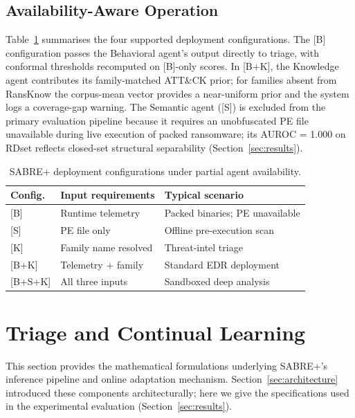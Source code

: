 \documentclass[journal]{IEEEtran}
\begin{document}
\subsection{Availability-Aware Operation}
\label{subsec:availability}

Table~\ref{tab:deployment_configs} summarises the four supported deployment configurations.
The {[}B{]} configuration passes the Behavioral agent's output directly to triage, with
conformal thresholds recomputed on {[}B{]}-only scores.
In {[}B{+}K{]}, the Knowledge agent contributes its family-matched ATT\&CK prior; for
families absent from RansKnow the corpus-mean vector provides a near-uniform prior and
the system logs a coverage-gap warning.
The Semantic agent ({[}S{]}) is excluded from the primary evaluation pipeline because it
requires an unobfuscated PE file unavailable during live execution of packed ransomware;
its AUROC = 1.000 on RDset reflects closed-set structural separability
(Section~\ref{sec:results}).

\begin{table}[t]
\centering
\caption{SABRE+ deployment configurations under partial agent availability.}
\label{tab:deployment_configs}
\setlength{\tabcolsep}{3pt}
\begin{tabular}{lp{2.1cm}p{2.3cm}}
\toprule
\textbf{Config.} & \textbf{Input requirements} & \textbf{Typical scenario} \\
\midrule
{[}B{]}       & Runtime telemetry    & Packed binaries; PE unavailable \\
{[}S{]}       & PE file only         & Offline pre-execution scan \\
{[}K{]}       & Family name resolved & Threat-intel triage \\
{[}B{+}K{]}   & Telemetry + family   & Standard EDR deployment \\
{[}B{+}S{+}K{]} & All three inputs   & Sandboxed deep analysis \\
\bottomrule
\end{tabular}
\end{table}

\section{Triage and Continual Learning}
\label{sec:triage_cl}

This section provides the mathematical formulations underlying SABRE+'s inference
pipeline and online adaptation mechanism.
Section~\ref{sec:architecture} introduced these components architecturally;
here we give the specifications used in the experimental evaluation
(Section~\ref{sec:results}).
\end{document}
